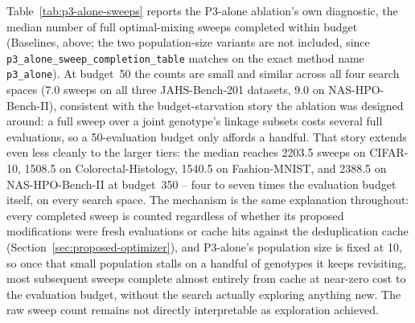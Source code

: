 Table~\ref{tab:p3-alone-sweeps} reports the P3-alone ablation's own diagnostic, the median number of full
optimal-mixing sweeps completed within budget (Baselines, above; the two population-size variants are not
included, since \texttt{p3\_alone\_sweep\_completion\_table} matches on the exact method name
\texttt{p3\_alone}). At budget~50 the counts are small and similar across all four search spaces (7.0
sweeps on all three JAHS-Bench-201 datasets, 9.0 on NAS-HPO-Bench-II), consistent with the budget-starvation
story the ablation was designed around: a full sweep over a joint genotype's linkage subsets costs several
full evaluations, so a 50-evaluation budget only affords a handful. That story extends even less cleanly to
the larger tiers: the median reaches 2203.5 sweeps on CIFAR-10, 1508.5 on Colorectal-Histology, 1540.5 on
Fashion-MNIST, and 2388.5 on NAS-HPO-Bench-II at budget~350 -- four to seven times the evaluation budget
itself, on every search space. The mechanism is the same explanation throughout: every completed sweep is
counted regardless of whether its proposed modifications were fresh evaluations or cache hits against the
deduplication cache (Section~\ref{sec:proposed-optimizer}), and P3-alone's population size is fixed at 10,
so once that small population stalls on a handful of genotypes it keeps revisiting, most subsequent sweeps
complete almost entirely from cache at near-zero cost to the evaluation budget, without the search actually
exploring anything new. The raw sweep count remains not directly interpretable as exploration achieved.

